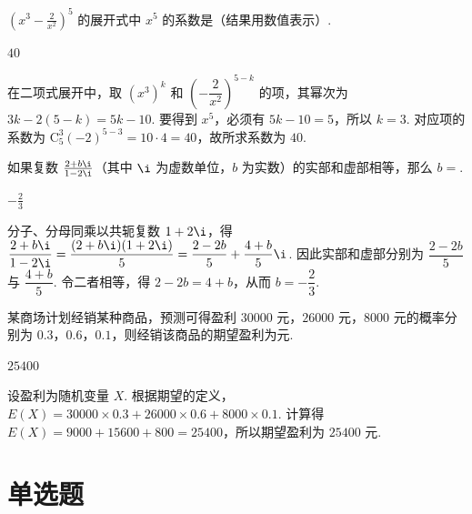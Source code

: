 \begin{problem}
\(\left(x^{3}-\frac{2}{x^{2}}\right)^{5} \) 的展开式中 \(x^{5} \) 的系数是（结果用数值表示）\fillinblank{}.
\end{problem}

\begin{answer}
\(40\)
\end{answer}

\begin{solution}
在二项式展开中，取 \(\left(x^3\right)^k\) 和 \(\left(-\dfrac{2}{x^2}\right)^{5-k}\) 的项，其幂次为
\(3k-2(5-k)=5k-10\). 要得到 \(x^5\)，必须有 \(5k-10=5\)，所以 \(k=3\). 对应项的系数为
\(\mathrm C_5^3(-2)^{5-3}=10\cdot4=40\)，故所求系数为 \(40\).
\end{solution}

\begin{problem}
如果复数 \(\frac{2+b\i}{1-2\i} \)（其中 \(\i\) 为虚数单位，\(b\) 为实数）的实部和虚部相等，那么 \(b=\)\fillinblank{}.
\end{problem}

\begin{answer}
\(-\frac{2}{3}\)
\end{answer}

\begin{solution}
分子、分母同乘以共轭复数 \(1+2\i\)，得
\(\dfrac{2+b\i}{1-2\i}=\dfrac{(2+b\i)(1+2\i)}{5}=\dfrac{2-2b}{5}+\dfrac{4+b}{5}\i\). 因此实部和虚部分别为 \(\dfrac{2-2b}{5}\) 与 \(\dfrac{4+b}{5}\). 令二者相等，得 \(2-2b=4+b\)，从而 \(b=-\dfrac23\).
\end{solution}

\begin{problem}
某商场计划经销某种商品，预测可得盈利 \(30000\) 元，\(26000\) 元，\(8000\) 元的概率分别为 \(0.3\)，\(0.6\)，\(0.1\)，则经销该商品的期望盈利为\fillinblank{}\(\text{元}\).
\end{problem}

\begin{answer}
\(25400\)
\end{answer}

\begin{solution}
设盈利为随机变量 \(X\). 根据期望的定义，\(E(X)=30000\times0.3+26000\times0.6+8000\times0.1\). 计算得 \(E(X)=9000+15600+800=25400\)，所以期望盈利为 \(25400\) 元.
\end{solution}

\section{单选题}

